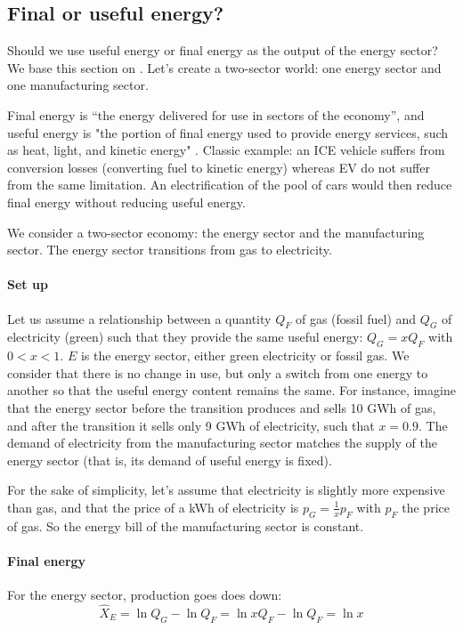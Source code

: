 \subsection{Final or useful energy?}
\label{sect_final_useful_energy}

Should we use useful energy or final energy as the output of the energy sector? We base this section on \cite{wayEmpiricallyGroundedTechnology2022}. Let's create a two-sector world: one energy sector and one manufacturing sector. 

Final energy is ``the energy delivered for use in sectors of the economy'', and useful energy is "the portion of final energy used to provide energy services, such as heat, light, and kinetic energy" \citep{wayEmpiricallyGroundedTechnology2022}. Classic example: an ICE vehicle suffers from conversion losses (converting fuel to kinetic energy) whereas EV do not suffer from the same limitation. An electrification of the pool of cars would then reduce final energy without reducing useful energy.

We consider a two-sector economy: the energy sector and the manufacturing sector. The energy sector transitions from gas to electricity.

\paragraph{Set up}
Let us assume a relationship between a quantity $Q_F$ of gas (fossil fuel) and $Q_G$ of electricity (green) such that they provide the same useful energy: $Q_G=xQ_F$ with $0<x<1$.  $E$ is the energy sector, either green electricity or fossil gas. We consider that there is no change in use, but only a switch from one energy to another so that the useful energy content remains the same. For instance, imagine that the energy sector before the transition produces and sells 10 GWh of gas, and after the transition it sells only 9 GWh of electricity, such that $x=0.9$. The demand of electricity from the manufacturing sector matches the supply of the energy sector (that is, its demand of useful energy is fixed).
  
For the sake of simplicity, let's assume that electricity is slightly more expensive than gas, and that the price of a kWh of electricity is $p_{G}=\frac{1}{x}p_F$ with $p_F$ the price of gas. So the energy bill of the manufacturing sector is constant.




\paragraph{Final energy} 
For the energy sector, production goes does down: 
\begin{equation}
\hat{X}_E=\ln{Q_G}-\ln{Q_F}=\ln{xQ_F}-\ln{Q_F}=\ln{x}
\end{equation}

